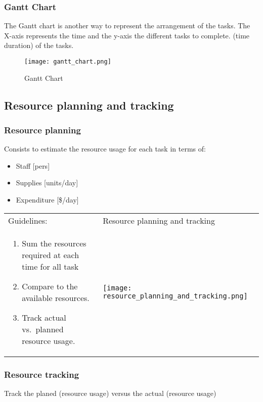 \subsubsection{Gantt Chart}

The Gantt chart is another way to represent the arrangement of the
tasks. The X-axis represents the time and the y-axis the different tasks
to complete. (time duration) of the tasks.

\begin{figure}[!ht]
    \centering
    \texttt{[image: gantt\_chart.png]}
    \caption{Gantt Chart}
\end{figure}
\FloatBarrier{}


\subsection{Resource planning and tracking}

\subsubsection{Resource planning}
Consists to estimate the resource usage for each task in terms of:
\begin{itemize}
    \item Staff [pers]
    \item Supplies [units/day]
    \item Expenditure [\$/day]
\end{itemize}

\begin{tabular}{m{8cm}m{9cm}}
    Guidelines: & Resource planning and tracking \\
    \begin{enumerate}
        \item Sum the resources required at each time for all task
        \item Compare to the available resources.
        \item Track actual vs.\ planned resource usage.
    \end{enumerate}
    &
    \texttt{[image: resource\_planning\_and\_tracking.png]}
\end{tabular}

\subsubsection{Resource tracking}
Track the planed (resource usage) versus the actual (resource usage)

